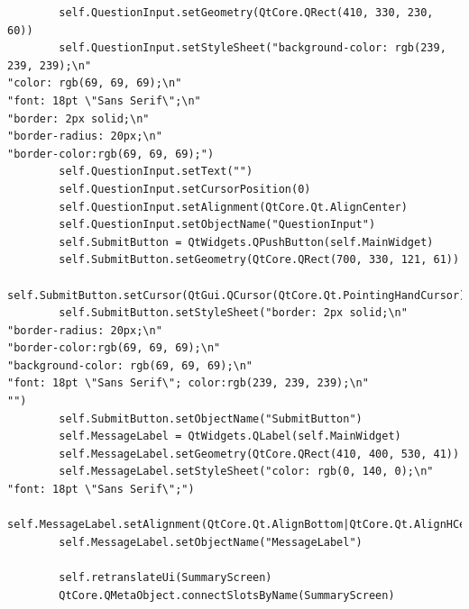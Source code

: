 \documentclass{article}
\begin{document}
\begin{lstlisting}
        self.QuestionInput.setGeometry(QtCore.QRect(410, 330, 230, 60))
        self.QuestionInput.setStyleSheet("background-color: rgb(239, 239, 239);\n"
"color: rgb(69, 69, 69);\n"
"font: 18pt \"Sans Serif\";\n"
"border: 2px solid;\n"
"border-radius: 20px;\n"
"border-color:rgb(69, 69, 69);")
        self.QuestionInput.setText("")
        self.QuestionInput.setCursorPosition(0)
        self.QuestionInput.setAlignment(QtCore.Qt.AlignCenter)
        self.QuestionInput.setObjectName("QuestionInput")
        self.SubmitButton = QtWidgets.QPushButton(self.MainWidget)
        self.SubmitButton.setGeometry(QtCore.QRect(700, 330, 121, 61))
        self.SubmitButton.setCursor(QtGui.QCursor(QtCore.Qt.PointingHandCursor))
        self.SubmitButton.setStyleSheet("border: 2px solid;\n"
"border-radius: 20px;\n"
"border-color:rgb(69, 69, 69);\n"
"background-color: rgb(69, 69, 69);\n"
"font: 18pt \"Sans Serif\"; color:rgb(239, 239, 239);\n"
"")
        self.SubmitButton.setObjectName("SubmitButton")
        self.MessageLabel = QtWidgets.QLabel(self.MainWidget)
        self.MessageLabel.setGeometry(QtCore.QRect(410, 400, 530, 41))
        self.MessageLabel.setStyleSheet("color: rgb(0, 140, 0);\n"
"font: 18pt \"Sans Serif\";")
        self.MessageLabel.setAlignment(QtCore.Qt.AlignBottom|QtCore.Qt.AlignHCenter)
        self.MessageLabel.setObjectName("MessageLabel")

        self.retranslateUi(SummaryScreen)
        QtCore.QMetaObject.connectSlotsByName(SummaryScreen)


\end{lstlisting}
\end{document}
